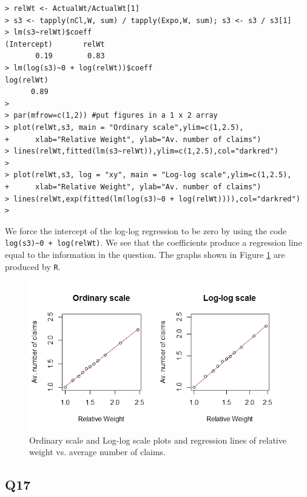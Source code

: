 \documentclass[11pt]{article}
\begin{document}
\begin{verbatim}
> relWt <- ActualWt/ActualWt[1]
> s3 <- tapply(nCl,W, sum) / tapply(Expo,W, sum); s3 <- s3 / s3[1]
> lm(s3~relWt)$coeff
(Intercept)       relWt 
       0.19        0.83 
> lm(log(s3)~0 + log(relWt))$coeff
log(relWt) 
      0.89 
> 
> par(mfrow=c(1,2)) #put figures in a 1 x 2 array
> plot(relWt,s3, main = "Ordinary scale",ylim=c(1,2.5),
+      xlab="Relative Weight", ylab="Av. number of claims")
> lines(relWt,fitted(lm(s3~relWt)),ylim=c(1,2.5),col="darkred")
> 
> plot(relWt,s3, log = "xy", main = "Log-log scale",ylim=c(1,2.5),
+      xlab="Relative Weight", ylab="Av. number of claims")
> lines(relWt,exp(fitted(lm(log(s3)~0 + log(relWt)))),col="darkred")
>
\end{verbatim}

We force the intercept of the log-log regression to be zero by using the code \verb|log(s3)~0 + log(relWt)|. We see that the coefficients produce a regression line equal to the information in the question. The graphs shown in Figure \ref{Figure_Question16} are produced by \verb|R|.
\begin{center}
\begin{figure}[h]

\includegraphics[scale=1]{Q16_OrdinaryAndLogLogScalePlot.png}

\caption{Ordinary scale and Log-log scale plots and regression lines of relative weight vs. average number of claims.}
\label{Figure_Question16}

\end{figure}
\end{center}

\subsection*{Q17}
\end{document}

